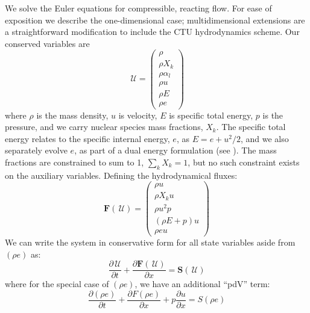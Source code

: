 \documentclass[times,preprint]{aastex63}
\newcommand{\ddx}[1]{{\frac{{\partial#1}}{\partial x}}}
\newcommand{\ddt}[1]{{\frac{{\partial#1}}{\partial t}}}
\newcommand{\Uc}{{\,\bm{\mathcal{U}}}}
\newcommand{\Fb}{\mathbf{F}}
\newcommand{\Sc}{\mathbf{S}}
\begin{document}
We solve the Euler equations for compressible, reacting flow.  For ease
of exposition we describe the one-dimensional case;
multidimensional extensions are a straightforward modification to
include the CTU hydrodynamics scheme.  Our conserved variables are
\begin{equation}
  \Uc = \left ( \begin{array}{c}
           \rho \\
           \rho X_k \\
           \rho \alpha_l \\
           \rho u \\
           \rho E \\
           \rho e \end{array}\right )
\end{equation}
where $\rho$ is the mass density, $u$ is velocity, $E$ is specific
total energy, $p$ is the pressure, and we carry nuclear species mass
fractions, $X_k$.  The specific total
energy relates to the specific internal energy, $e$, as $E = e + u^2/2$,
and we also separately evolve $e$, as part of a dual
energy formulation (see \citealt{bryan:1995,wdmergerI}).
 The mass fractions are constrained to sum to 1, $\sum_k X_k = 1$, but
 no such constraint exists on the auxiliary variables. 
Defining the hydrodynamical fluxes:
\begin{equation}
  \Fb(\Uc) = \left ( \begin{array}{c}
         \rho u \\
         \rho X_k u \\
         \rho u^2 p \\
         (\rho E + p) u \\
         \rho e u \end{array}\right )
\end{equation}
We can write the system in conservative form for all state variables aside from $(\rho e)$ as:
\begin{equation}
  \ddt{\Uc} + \ddx{\Fb(\Uc)} = \Sc(\Uc)
\end{equation}
where for the special case of $(\rho e)$, we have an additional ``pdV'' term:
\begin{equation}
\ddt{(\rho e)} + \ddx{F(\rho e)} + p \ddx{u} = S(\rho e)
\end{equation}
\end{document}
